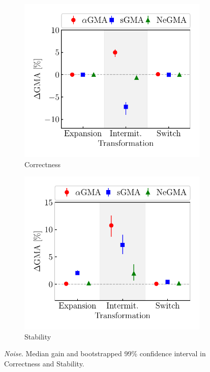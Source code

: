 \documentclass[letterpaper]{article}
\begin{document}
\begin{figure}[!t]
    \centering
    \begin{subfigure}[b]{.5\linewidth}
        \centering
        \includegraphics[width=\linewidth]{figures/noise_correctness.pdf}
        \caption{Correctness}
        \label{fig:noise_correctness}
    \end{subfigure}
    \hspace{-.5em}
    \begin{subfigure}[b]{.5\linewidth}
        \centering
        \includegraphics[width=\linewidth]{figures/noise_stability.pdf}
        \caption{Stability}
        \label{fig:noise_stability}
    \end{subfigure}
    \caption{\emph{Noise}. Median gain and bootstrapped 99\% confidence interval in Correctness and Stability.}
    \label{fig:noise}
\end{figure}
\end{document}
